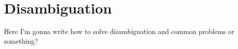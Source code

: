 \section{Disambiguation}
\label{sec:disambiguation}

Here I'm gonna write how to solve disambiguation and common problems or something?